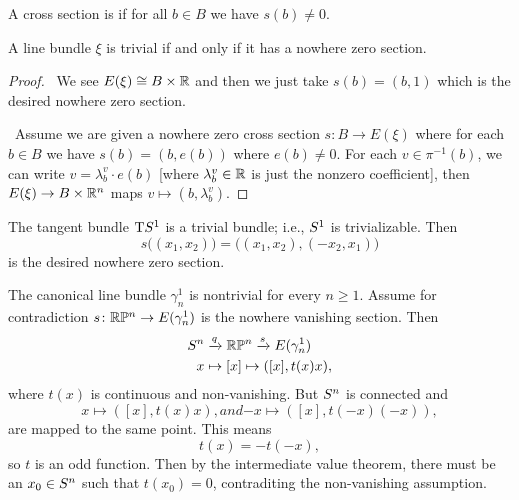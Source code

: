 \begin{definition}
A cross section is  if for all $b\in B$ we have $s(b)\neq0$.
\end{definition}

\begin{theorem}
A line bundle $\xi$ is trivial if and only if it has a nowhere zero section.
\end{theorem}

\begin{proof}
\forwardproof\ We see $E(\xi)\cong B\times\mathbb{R}$ and then we just take $s(b)=(b,1)$
which is the desired nowhere zero section.

\backwardproof\ Assume we are given a nowhere zero cross section
$s\colon B\to E(\xi)$ where for each $b\in B$ we have $s(b)=(b,e(b))$
where $e(b)\neq0$. For each $v\in\pi^{-1}(b)$, we can write
$v=\lambda^{v}_{b}\cdot e(b)$ [where $\lambda^{v}_{b}\in\mathbb{R}$ is just
the nonzero coefficient],
then $E(\xi)\to B\times\mathbb{R}^{n}$ maps $v\mapsto(b,\lambda^{v}_{b})$.
\end{proof}

\begin{example}
The tangent bundle $\mathrm{T}S^{1}$ is a trivial bundle; i.e.,
$S^{1}$ is trivializable. Then
\begin{equation}
s\bigl((x_{1},x_{2})\bigr)=\bigl((x_{1},x_{2}),(-x_{2},x_{1})\bigr)
\end{equation}
is the desired nowhere zero section.
\end{example}

\begin{non-example}
The canonical line bundle $\gamma^{1}_{n}$ is nontrivial for every $n\geq1$.
Assume for contradiction $s\colon\mathbb{R}\mathbb{P}^{n}\to E(\gamma^{1}_{n})$ is the
nowhere vanishing section. Then
\begin{align*}
S^{n} & \xrightarrow{q}\mathbb{R}\mathbb{P}^{n}\xrightarrow{s} E(\gamma^{1}_{n})\\
x&\mapsto [x]\mapsto([x],t(x)x),
\end{align*}
where $t(x)$ is continuous and non-vanishing. But $S^{n}$ is
connected and
\begin{subequations}
\begin{equation}
x\mapsto([x],t(x)x),
\end{equation}
and
\begin{equation}
-x\mapsto([x],t(-x)(-x)),
\end{equation}
\end{subequations}
are mapped to the same point. This means
\begin{equation}
t(x)=-t(-x),
\end{equation}
so $t$ is an odd function. Then by the intermediate value theorem,
there must be an $x_{0}\in S^{n}$ such that $t(x_{0})=0$,
contraditing the non-vanishing assumption.
\end{non-example}


